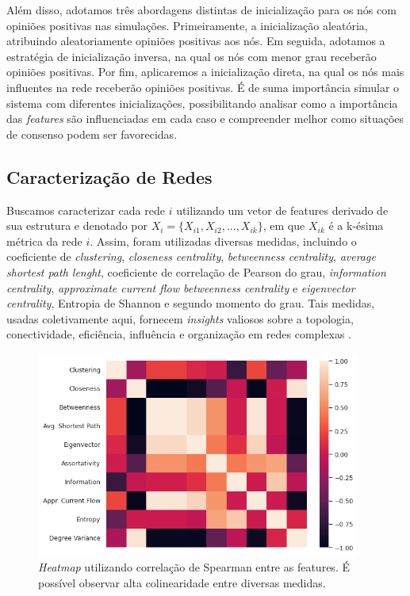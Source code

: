Além disso, adotamos três abordagens distintas de inicialização para os
nós com opiniões positivas nas simulações. Primeiramente, a
inicialização aleatória, atribuindo aleatoriamente opiniões positivas
aos nós. Em seguida, adotamos a estratégia de inicialização inversa, na
qual os nós com menor grau receberão opiniões positivas. Por fim,
aplicaremos a inicialização direta, na qual os nós mais influentes na
rede receberão opiniões positivas. É de suma importância simular o
sistema com diferentes inicializações, possibilitando analisar como a
importância das \emph{features} são influenciadas em cada caso e
compreender melhor como situações de consenso podem ser favorecidas.

\subsection{Caracterização de
Redes}\label{caracterizauxe7uxe3o-de-redes}

Buscamos caracterizar cada rede \(i\) utilizando um vetor de features
derivado de sua estrutura e denotado por
\(X_i=\{X_{i1}, X_{i2}, ...,X_{ik}\}\), em que \(X_{ik}\) é a k-ésima
métrica da rede \(i\). Assim, foram utilizadas diversas medidas,
incluindo o coeficiente de \emph{clustering}, \emph{closeness
centrality}, \emph{betweenness centrality}, \emph{average shortest path
lenght}, coeficiente de correlação de Pearson do grau, \emph{information
centrality}, \emph{approximate current flow betweenness centrality} e
\emph{eigenvector centrality}, Entropia de Shannon e segundo momento do
grau. Tais medidas, usadas coletivamente aqui, fornecem \emph{insights}
valiosos sobre a topologia, conectividade, eficiência, influência e
organização em redes complexas \cite{costa2007characterization}.

\begin{figure}
\centering
\includegraphics[width=\textwidth,height=2.66667in]{heatmap.png}
\caption{\emph{Heatmap} utilizando correlação de Spearman entre as
features. É possível observar alta colinearidade entre diversas
medidas.}
\end{figure}


